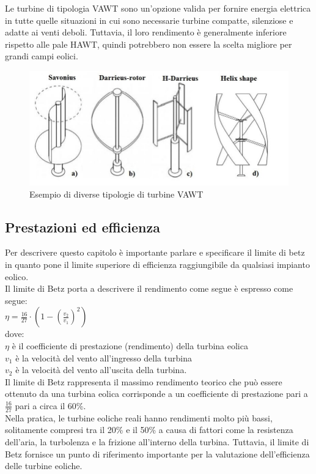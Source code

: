 Le turbine di tipologia VAWT sono un'opzione valida per fornire energia elettrica in tutte quelle situazioni in cui sono necessarie turbine compatte, silenziose e adatte ai venti deboli.
Tuttavia, il loro rendimento è generalmente inferiore rispetto alle pale HAWT, quindi potrebbero non essere la scelta migliore per grandi campi eolici.
\begin{figure}[H]
    \centering
    \includegraphics[height=0.3\textwidth]{res/cap 3/VAWT}
    \caption{Esempio di diverse tipologie di turbine VAWT}
\end{figure}\noindent
\subsection{Prestazioni ed efficienza}
Per descrivere questo capitolo è importante parlare e specificare il limite di betz in quanto pone il limite superiore di efficienza raggiungibile da qualsiasi impianto eolico.\\
Il limite di Betz porta a descrivere il rendimento come segue è espresso come segue:\\
\large{$\eta = \frac{16}{27} \cdot (1 - (\frac{v_2}{v_1})^2)$}\\
dove:\\
\large{$\eta$} è il coefficiente di prestazione (rendimento) della turbina eolica\\
\large{$v_1$} è la velocità del vento all'ingresso della turbina\\
\large{$v_2$} è la velocità del vento all'uscita della turbina.\\
Il limite di Betz rappresenta il massimo rendimento teorico che può essere ottenuto da una turbina eolica corrisponde a un coefficiente di prestazione pari a $\frac{16}{27}$ pari a circa il 60\%.\\
Nella pratica, le turbine eoliche reali hanno rendimenti molto più bassi, solitamente compresi tra il 20\% e il 50\% a causa di fattori come la resistenza dell'aria, la turbolenza e la frizione all'interno della turbina. Tuttavia, il limite di Betz fornisce un punto di riferimento importante per la valutazione dell'efficienza delle turbine eoliche.
